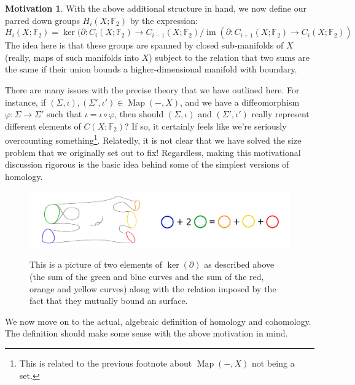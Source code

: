 \documentclass[12pt]{article}
\theoremstyle{definition}
\newtheorem{motivation}[theorem]{Motivation}
\numberwithin{equation}{section}
\newcommand{\op}{\operatorname}
\begin{document}
\begin{motivation}
With the above additional structure in hand, we now define our parred down groups $H_i(X;\mathbb{F}_2)$ by the expression:
\[
H_i(X;\mathbb{F}_2) = \op{ker}(\partial:C_i(X;\mathbb{F}_2) \to C_{i-1}(X;\mathbb{F}_2)/\op{im}(\partial:C_{i+1}(X;\mathbb{F}_2) \to C_i(X;\mathbb{F}_2))
\]
The idea here is that these groups are spanned by closed sub-manifolds of $X$ (really, maps of such manifolds into $X$) subject to the relation that two sums are the same if their union bounds a higher-dimensional manifold with boundary. 

There are many issues with the precise theory that we have outlined here. For instance, if $(\Sigma,\iota),(\Sigma',\iota') \in \op{Map}(-,X)$, and we have a diffeomorphism $\varphi:\Sigma \to \Sigma'$ such that $\iota = \iota \circ \varphi$, then should $(\Sigma,\iota)$ and $(\Sigma',\iota')$ really represent different elements of $C(X;\mathbb{F}_2)$? If so, it certainly feels like we're seriously overcounting something\footnote{This is related to the previous footnote about $\op{Map}(-,X)$ not being a set.}. Relatedly, it is not clear that we have solved the size problem that we originally set out to fix! Regardless, making this motivational discussion rigorous is the basic idea behind some of the simplest versions of homology.
\end{motivation} 

\begin{figure}[h]
    \centering
    \includegraphics[width=1\textwidth]{reu_figures/motivational_homology.png}
    \label{fig:motivational_homology}
    \caption{This is a picture of two elements of $\op{ker}(\partial)$ as described above (the sum of the green and blue curves and the sum of the red, orange and yellow curves) along with the relation imposed by the fact that they mutually bound an surface.}
\end{figure}

We now move on to the actual, algebraic definition of homology and cohomology. The definition should make some sense with the above motivation in mind.
\end{document}
